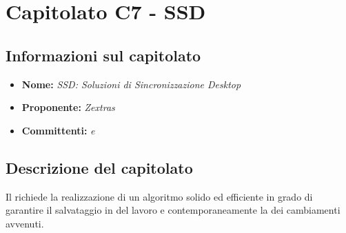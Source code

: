 \section{Capitolato C7 - SSD}\label{C7}
\subsection{Informazioni sul capitolato}
\begin{itemize}
	\item \textbf{Nome:} \textit{SSD: Soluzioni di Sincronizzazione Desktop}
	\item \textbf{Proponente:} \textit{Zextras}
	\item \textbf{Committenti:} \textit{\VT{} e \CR{}}
\end{itemize}

\subsection{Descrizione del capitolato}
Il  richiede la realizzazione di un algoritmo solido ed efficiente in grado di garantire il salvataggio in  del lavoro e contemporaneamente la  dei cambiamenti avvenuti.

